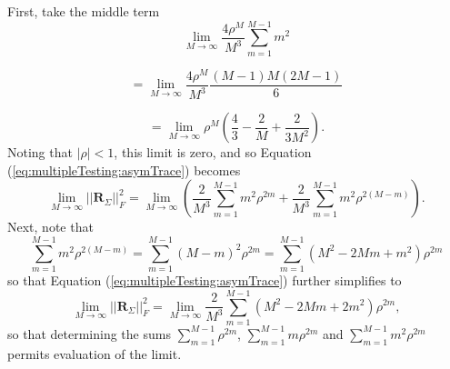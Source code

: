 \documentclass[letterpaper,12pt,oneside,final]{article}
\newcommand{\m}[1]{\mathbf{#1}}               %
\newcommand{\norm}[1]{||{#1}||}              %
\newcommand{\frob}[1]{\norm{#1}_F}
\newcommand{\abs}[1]{\lvert{#1}\rvert}              %
\begin{document}
First, take the middle term
$$\lim_{M \rightarrow \infty} \frac{4\rho^M}{M^3}\sum_{m = 1}^{M-1} m^2$$

$$=\lim_{M \rightarrow \infty} \frac{4\rho^M}{M^3} \frac{(M-1)M(2M-1)}{6}$$

$$=\lim_{M \rightarrow \infty} \rho^M \left ( \frac{4}{3} - \frac{2}{M} + \frac{2}{3M^2} \right ).$$
Noting that $\abs{\rho} < 1$, this limit is zero, and so Equation (\ref{eq:multipleTesting:asymTrace}) becomes
\begin{equation*}
    \lim_{M \rightarrow \infty} \frob{\m{R}_{\Sigma}}^2  = \lim_{M \rightarrow \infty} \left ( \frac{2}{M^3} \sum_{m = 1}^{M-1} m^2 \rho^{2m} + \frac{2}{M^3} \sum_{m = 1}^{M-1} m^2 \rho^{2(M-m)} \right ).
\end{equation*}
Next, note that
$$\sum_{m = 1}^{M-1} m^2 \rho^{2(M-m)} = \sum_{m = 1}^{M-1} (M - m)^2 \rho^{2m} = \sum_{m = 1}^{M-1} (M^2 - 2Mm + m^2) \rho^{2m}$$
so that Equation (\ref{eq:multipleTesting:asymTrace}) further simplifies to
\begin{equation} \label{eq:multipleTesting:traceSimpd}
    \lim_{M \rightarrow \infty} \frob{\m{R}_{\Sigma}}^2  = \lim_{M \rightarrow \infty} \frac{2}{M^3} \sum_{m = 1}^{M-1} (M^2 - 2Mm + 2m^2) \rho^{2m},
\end{equation}
so that determining the sums $\sum_{m = 1}^{M-1} \rho^{2m}$, $\sum_{m = 1}^{M-1} m \rho^{2m}$ and $\sum_{m=1}^{M-1} m^2 \rho^{2m}$ permits evaluation of the limit.
\end{document}
